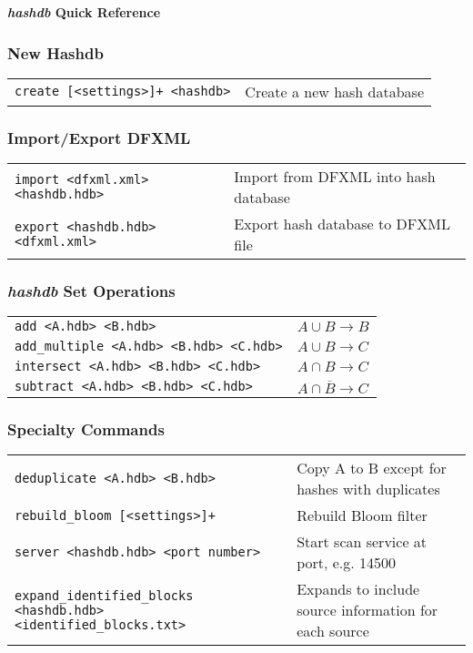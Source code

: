\documentclass[12pt]{article}
\newcommand{\hdb}{\emph{hashdb}\xspace}
\begin{document}
\begin{center}
\textbf{\Large \hdb Quick Reference}
\end{center}


\subsubsection*{New Hashdb}
\begin{tabular}{p{8 cm} p{9 cm} }
\texttt{create [<settings>]+ <hashdb>} & Create a new hash database \\
\end{tabular}

\subsubsection*{Import/Export DFXML}
\begin{tabular}{p{8 cm} p{9 cm} }
\texttt{import <dfxml.xml> <hashdb.hdb>} & Import from DFXML into hash database \\
\texttt{export <hashdb.hdb> <dfxml.xml>} & Export hash database to DFXML file \\
\end{tabular}

\subsubsection*{\hdb Set Operations}
\begin{tabular}{p{8 cm} p{9 cm} }
\texttt{add <A.hdb> <B.hdb>} & $A \cup B \rightarrow B$ \\
\texttt{add\_multiple <A.hdb> <B.hdb> <C.hdb>} & $A \cup B \rightarrow C$ \\
\texttt{intersect <A.hdb> <B.hdb> <C.hdb>} & $A \cap B \rightarrow C$ \\
\texttt{subtract <A.hdb> <B.hdb> <C.hdb>} & $A \cap \overline B \rightarrow C$ \\
\end{tabular}

\subsubsection*{Specialty Commands}
\begin{tabular}{p{8 cm} p{9 cm} }
\texttt{deduplicate <A.hdb> <B.hdb>} & Copy A to B except for hashes with duplicates \\
\texttt{rebuild\_bloom [<settings>]+} & Rebuild Bloom filter \\
\texttt{server <hashdb.hdb> <port number>} & Start scan service at port, e.g. 14500 \\
\texttt{expand\_identified\_blocks <hashdb.hdb> <identified\_blocks.txt>} & Expands to include source information for each source \\
\end{tabular}
\end{document}
